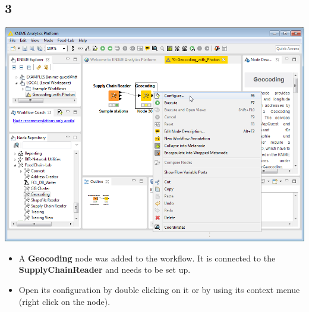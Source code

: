 \documentclass{beamer}
\begin{document}
\subsection{3}
\begin{frame}
	\begin{center}
  		\includegraphics[height=0.6\textheight]{3.png}
	\end{center}
	\begin{itemize}
        \item A \textbf{Geocoding} node was added to the workflow. It is connected to the \textbf{SupplyChainReader} and needs to be set up.
		\item Open its configuration by double clicking on it or by using its context menue (right click on the node).
	\end{itemize}
\end{frame}
\end{document}
